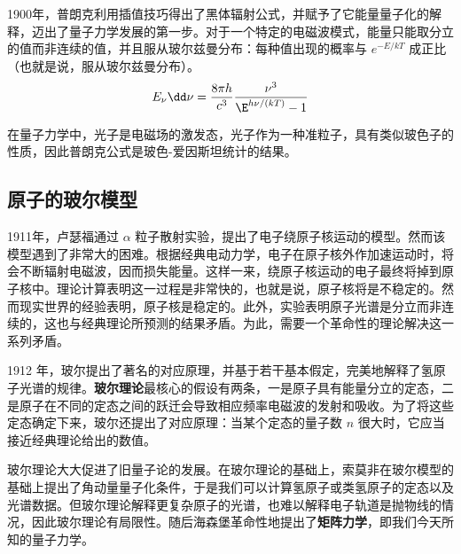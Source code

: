 1900年，普朗克利用插值技巧得出了黑体辐射公式，并赋予了它能量量子化的解释，迈出了量子力学发展的第一步。对于一个特定的电磁波模式，能量只能取分立的值而非连续的值，并且服从玻尔兹曼分布：每种值出现的概率与 $e^{-E/kT}$ 成正比（也就是说，服从玻尔兹曼分布）。
\begin{equation}
E_\nu \dd \nu=\frac{8\pi h}{c^3}\frac{\nu^3}{\E^{h\nu/(k T)} - 1}
\end{equation}

在量子力学中，光子是电磁场的激发态，光子作为一种准粒子，具有类似玻色子的性质，因此普朗克公式是玻色-爱因斯坦统计的结果。

\subsection{原子的玻尔模型}
1911年，卢瑟福通过 $\alpha$ 粒子散射实验，提出了电子绕原子核运动的模型。然而该模型遇到了非常大的困难。根据经典电动力学，电子在原子核外作加速运动时，将会不断辐射电磁波，因而损失能量。这样一来，绕原子核运动的电子最终将掉到原子核中。理论计算表明这一过程是非常快的，也就是说，原子核将是不稳定的。然而现实世界的经验表明，原子核是稳定的。此外，实验表明原子光谱是分立而非连续的，这也与经典理论所预测的结果矛盾。为此，需要一个革命性的理论解决这一系列矛盾。

1912 年，玻尔提出了著名的对应原理，并基于若干基本假定，完美地解释了氢原子光谱的规律。\textbf{玻尔理论}最核心的假设有两条，一是原子具有能量分立的定态，二是原子在不同的定态之间的跃迁会导致相应频率电磁波的发射和吸收。为了将这些定态确定下来，玻尔还提出了对应原理：当某个定态的量子数 $n$ 很大时，它应当接近经典理论给出的数值。

玻尔理论大大促进了旧量子论的发展。在玻尔理论的基础上，索莫非在玻尔模型的基础上提出了角动量量子化条件，于是我们可以计算氢原子或类氢原子的定态以及光谱数据。但玻尔理论解释更复杂原子的光谱，也难以解释电子轨道是抛物线的情况，因此玻尔理论有局限性。随后海森堡革命性地提出了\textbf{矩阵力学}，即我们今天所知的量子力学。